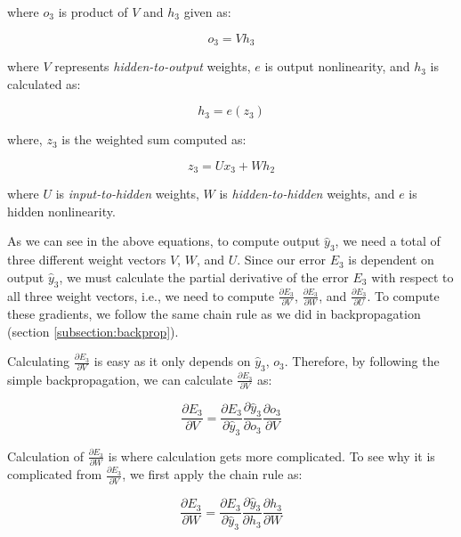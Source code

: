 where $o_3$ is product of $V$ and $h_3$ given as:

\begin{equation}
    o_3 = V h_3
\end{equation}

where $V$ represents \textit{hidden-to-output} weights, $e$ is output nonlinearity, and $h_3$ is calculated as:

\begin{equation}
    h_3 = e(z_3)
\end{equation}

where, $z_3$ is the weighted sum computed as:

\begin{equation}
    \label{eq:z3}
    z_3 = Ux_3 + Wh_2
\end{equation}

where $U$ is \textit{input-to-hidden} weights, $W$ is \textit{hidden-to-hidden} weights, and $e$ is hidden nonlinearity.

As we can see in the above equations, to compute output $\hat{y}_3$, we need a total of three different weight vectors $V$, $W$, and $U$. Since our error $E_3$ is dependent on output $\hat{y}_3$, we must calculate the partial derivative of the error $E_3$ with respect to all three weight vectors, i.e., we need to compute $\frac{\partial E_3}{\partial V}$, $\frac{\partial E_3}{\partial W}$, and $\frac{\partial E_3}{\partial U}$. To compute these gradients, we follow the same chain rule as we did in backpropagation (section \ref{subsection:backprop}).

Calculating $\frac{\partial E_3}{\partial V}$ is easy as it only depends on $\hat{y}_3$, $o_3$. Therefore, by following the simple backpropagation, we can calculate $\frac{\partial E_3}{\partial V}$ as:

\begin{equation}
    \frac{\partial E_3}{\partial V} = \frac{\partial E_3}{\partial \hat{y}_3} \frac{\partial \hat{y}_3}{\partial o_3} \frac{\partial o_3}{\partial V}
\end{equation}

Calculation of $\frac{\partial E_3}{\partial W}$ is where calculation gets more complicated. To see why it is complicated from $\frac{\partial E_3}{\partial V}$, we first apply the chain rule as:

\begin{equation}
    \label{eq:wrt_W}
    \frac{\partial E_3}{\partial W} = \frac{\partial E_3}{\partial \hat{y}_3} \frac{\partial \hat{y}_3}{\partial h_3} \frac{\partial h_3}{\partial W}
\end{equation}

